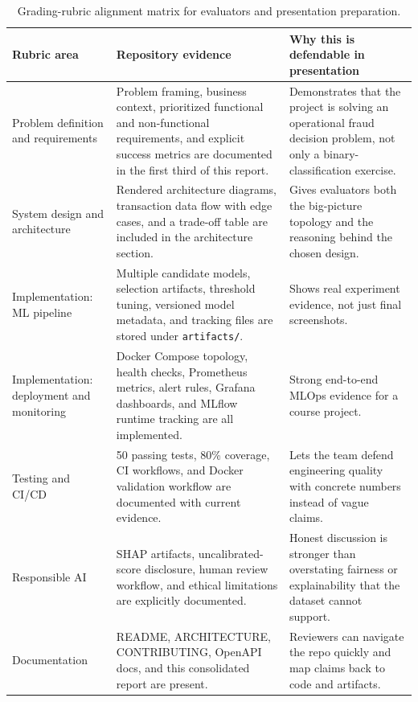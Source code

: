 \documentclass[11pt]{article}
\newcommand{\code}[1]{\texttt{#1}}
\begin{document}
\begin{table}[H]
\small
\centering
\begin{tabularx}{\textwidth}{p{}p{}X}
\toprule
Rubric area & Repository evidence & Why this is defendable in presentation \\
\midrule
Problem definition and requirements & Problem framing, business context, prioritized functional and non-functional requirements, and explicit success metrics are documented in the first third of this report. & Demonstrates that the project is solving an operational fraud decision problem, not only a binary-classification exercise. \\
System design and architecture & Rendered architecture diagrams, transaction data flow with edge cases, and a trade-off table are included in the architecture section. & Gives evaluators both the big-picture topology and the reasoning behind the chosen design. \\
Implementation: ML pipeline & Multiple candidate models, selection artifacts, threshold tuning, versioned model metadata, and tracking files are stored under \code{artifacts/}. & Shows real experiment evidence, not just final screenshots. \\
Implementation: deployment and monitoring & Docker Compose topology, health checks, Prometheus metrics, alert rules, Grafana dashboards, and MLflow runtime tracking are all implemented. & Strong end-to-end MLOps evidence for a course project. \\
Testing and CI/CD & 50 passing tests, 80\% coverage, CI workflows, and Docker validation workflow are documented with current evidence. & Lets the team defend engineering quality with concrete numbers instead of vague claims. \\
Responsible AI & SHAP artifacts, uncalibrated-score disclosure, human review workflow, and ethical limitations are explicitly documented. & Honest discussion is stronger than overstating fairness or explainability that the dataset cannot support. \\
Documentation & README, ARCHITECTURE, CONTRIBUTING, OpenAPI docs, and this consolidated report are present. & Reviewers can navigate the repo quickly and map claims back to code and artifacts. \\
\bottomrule
\end{tabularx}
\caption{Grading-rubric alignment matrix for evaluators and presentation preparation.}
\end{table}
\end{document}
